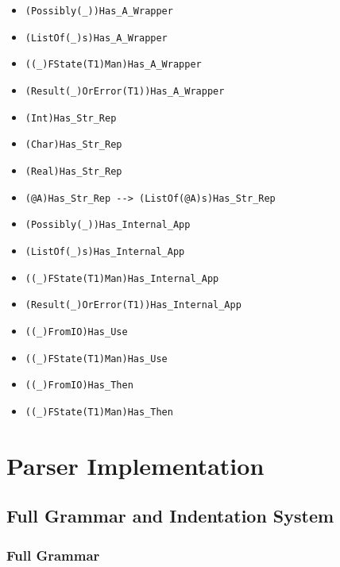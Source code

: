 \documentclass[diploma]{softlab-thesis}
\begin{document}
\begin{itemize}
  \begin{itemize}
  \item \verb|(Possibly(_))Has_A_Wrapper|
  \item \verb|(ListOf(_)s)Has_A_Wrapper|
  \item \verb|((_)FState(T1)Man)Has_A_Wrapper|
  \item \verb|(Result(_)OrError(T1))Has_A_Wrapper|
  \item \verb|(Int)Has_Str_Rep|
  \item \verb|(Char)Has_Str_Rep|
  \item \verb|(Real)Has_Str_Rep|
  \item \verb|(@A)Has_Str_Rep --> (ListOf(@A)s)Has_Str_Rep|
  \item \verb|(Possibly(_))Has_Internal_App|
  \item \verb|(ListOf(_)s)Has_Internal_App|
  \item \verb|((_)FState(T1)Man)Has_Internal_App|
  \item \verb|(Result(_)OrError(T1))Has_Internal_App|
  \item \verb|((_)FromIO)Has_Use|
  \item \verb|((_)FState(T1)Man)Has_Use|
  \item \verb|((_)FromIO)Has_Then|
  \item \verb|((_)FState(T1)Man)Has_Then|
  \end{itemize}

\end{itemize}

\newpage


\chapter{Parser Implementation}

\section{Full Grammar and Indentation System}

\subsection{Full Grammar}
\label{subsec:fullgrammar}
\end{document}
